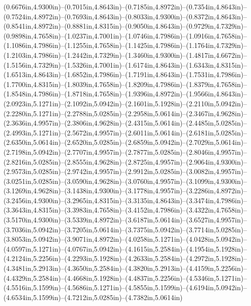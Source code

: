 (0.6676in,4.9300in)--(0.7015in,4.8643in)--(0.7185in,4.8972in)--(0.7354in,4.8643in)--(0.7524in,4.8972in)--(0.7693in,4.8643in)--(0.8033in,4.9300in)--(0.8372in,4.8643in)--(0.8541in,4.8972in)--(0.8881in,4.8315in)--(0.9050in,4.8643in)--(0.9729in,4.7329in)--(0.9898in,4.7658in)--(1.0237in,4.7001in)--(1.0746in,4.7986in)--(1.0916in,4.7658in)--(1.1086in,4.7986in)--(1.1255in,4.7658in)--(1.1425in,4.7986in)--(1.1764in,4.7329in)--(1.2103in,4.7986in)--(1.2442in,4.7329in)--(1.3460in,4.9300in)--(1.4817in,4.6672in)--(1.5156in,4.7329in)--(1.5326in,4.7001in)--(1.6174in,4.8643in)--(1.6343in,4.8315in)--(1.6513in,4.8643in)--(1.6852in,4.7986in)--(1.7191in,4.8643in)--(1.7531in,4.7986in)--(1.7700in,4.8315in)--(1.8039in,4.7658in)--(1.8209in,4.7986in)--(1.8379in,4.7658in)--(1.8548in,4.7986in)--(1.8718in,4.7658in)--(1.9396in,4.8972in)--(1.9566in,4.8643in)--(2.0923in,5.1271in)--(2.1092in,5.0942in)--(2.1601in,5.1928in)--(2.2110in,5.0942in)--(2.2280in,5.1271in)--(2.2788in,5.0285in)--(2.2958in,5.0614in)--(2.3467in,4.9628in)--(2.3636in,4.9957in)--(2.3806in,4.9628in)--(2.4315in,5.0614in)--(2.4485in,5.0285in)--(2.4993in,5.1271in)--(2.5672in,4.9957in)--(2.6011in,5.0614in)--(2.6181in,5.0285in)--(2.6350in,5.0614in)--(2.6520in,5.0285in)--(2.6859in,5.0942in)--(2.7029in,5.0614in)--(2.7198in,5.0942in)--(2.7707in,4.9957in)--(2.7877in,5.0285in)--(2.8046in,4.9957in)--(2.8216in,5.0285in)--(2.8555in,4.9628in)--(2.8725in,4.9957in)--(2.9064in,4.9300in)--(2.9573in,5.0285in)--(2.9742in,4.9957in)--(2.9912in,5.0285in)--(3.0082in,4.9957in)--(3.0251in,5.0285in)--(3.0590in,4.9628in)--(3.0760in,4.9957in)--(3.1099in,4.9300in)--(3.1269in,4.9628in)--(3.1438in,4.9300in)--(3.1778in,4.9957in)--(3.2286in,4.8972in)--(3.2456in,4.9300in)--(3.2965in,4.8315in)--(3.3135in,4.8643in)--(3.3474in,4.7986in)--(3.3643in,4.8315in)--(3.3983in,4.7658in)--(3.4152in,4.7986in)--(3.4322in,4.7658in)--(3.5170in,4.9300in)--(3.5339in,4.8972in)--(3.6187in,5.0614in)--(3.6527in,4.9957in)--(3.7036in,5.0942in)--(3.7205in,5.0614in)--(3.7375in,5.0942in)--(3.7714in,5.0285in)--(3.8053in,5.0942in)--(3.9071in,4.8972in)--(4.0258in,5.1271in)--(4.0428in,5.0942in)--(4.0597in,5.1271in)--(4.0767in,5.0942in)--(4.1615in,5.2584in)--(4.1954in,5.1928in)--(4.2124in,5.2256in)--(4.2293in,5.1928in)--(4.2633in,5.2584in)--(4.2972in,5.1928in)--(4.3481in,5.2913in)--(4.3650in,5.2584in)--(4.3820in,5.2913in)--(4.4159in,5.2256in)--(4.4329in,5.2584in)--(4.4668in,5.1928in)--(4.4837in,5.2256in)--(4.5346in,5.1271in)--(4.5516in,5.1599in)--(4.5686in,5.1271in)--(4.5855in,5.1599in)--(4.6194in,5.0942in)--(4.6534in,5.1599in)--(4.7212in,5.0285in)--(4.7382in,5.0614in) 